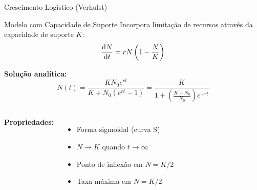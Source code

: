 \begin{frame}{Crescimento Logístico (Verhulst)}
\begin{block}{Modelo com Capacidade de Suporte}
Incorpora limitação de recursos através da capacidade de suporte $K$:
\begin{equation*}
\frac{\mathrm{d} N}{\mathrm{d} t} = rN\left(1 - \frac{N}{K}\right)
\end{equation*}
\end{block}

\textbf{Solução analítica:}
\begin{equation*}
N(t) = \frac{K N_0 e^{rt}}{K + N_0(e^{rt} - 1)} = \frac{K}{1 + \left(\frac{K-N_0}{N_0}\right)e^{-rt}}
\end{equation*}

\begin{columns}
\textbf{Propriedades:}
\begin{itemize}
    \item Forma sigmoidal (curva S)
    \item $N \to K$ quando $t \to \infty$
    \item Ponto de inflexão em $N = K/2$
    \item Taxa máxima em $N = K/2$
\end{itemize}

\begin{center}
\end{center}
\end{columns}
\end{frame}

